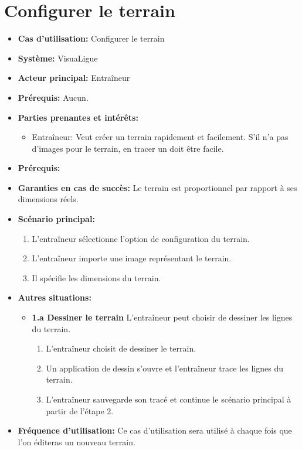 \section{Configurer le terrain}
\label{sec:configurer_le_terrain}

\begin{itemize}
    \item \textbf{Cas d'utilisation:} Configurer le terrain
    \item \textbf{Syst\`eme:} VisuaLigue
    \item \textbf{Acteur principal:} Entra\^ineur
    \item \textbf{Pr\'erequis:} Aucun.
    \item \textbf{Parties prenantes et int\'er\^ets:}
        \begin{itemize}
            \item Entraîneur: Veut créer un terrain rapidement et facilement. S'il n'a pas d'images pour le terrain, en tracer un doit être facile.
        \end{itemize}
    \item \textbf{Pr\'erequis:}
    \item \textbf{Garanties en cas de succ\`es:} Le terrain est proportionnel par rapport à ses dimensions réels.
    \item \textbf{Sc\'enario principal:}
        \begin{enumerate}
        	\item L'entraîneur sélectionne l'option de configuration du terrain.
            \item L'entraîneur importe une image représentant le terrain.
            \item Il spécifie les dimensions du terrain.
        \end{enumerate}
    \item \textbf{Autres situations:}
        \begin{itemize}
            \item \textbf{1.a Dessiner le terrain} L'entraîneur peut choisir de dessiner les lignes du terrain.
                \begin{enumerate}
                    \item L'entraîneur choisit de dessiner le terrain.
                    \item Un application de dessin s'ouvre et l'entraîneur trace les lignes du terrain.
                    \item L'entraîneur sauvegarde son tracé et continue le scénario principal à partir de l'étape 2.
                \end{enumerate}

        \end{itemize}
    \item \textbf{Fréquence d'utilisation:} Ce cas d'utilisation sera utilisé à chaque fois que l'on éditeras un nouveau terrain.
\end{itemize}



